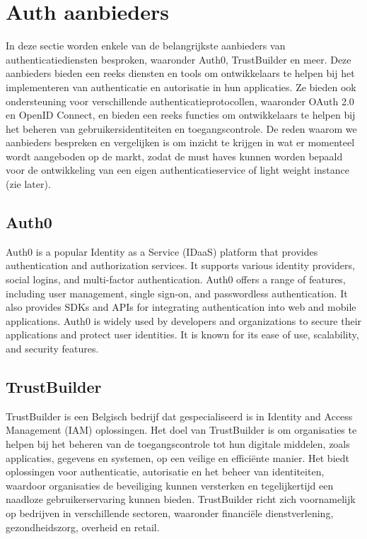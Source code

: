 \section{Auth aanbieders}%
\label{sec:auth-aanbieders}
In deze sectie worden enkele van de belangrijkste aanbieders van authenticatiediensten besproken, waaronder Auth0, TrustBuilder en meer. Deze aanbieders bieden een reeks diensten en tools om ontwikkelaars te helpen bij het implementeren van authenticatie en autorisatie in hun applicaties. Ze bieden ook ondersteuning voor verschillende authenticatieprotocollen, waaronder OAuth 2.0 en OpenID Connect, en bieden een reeks functies om ontwikkelaars te helpen bij het beheren van gebruikersidentiteiten en toegangscontrole.
De reden waarom we aanbieders bespreken en vergelijken is om inzicht te krijgen in wat er momenteel wordt aangeboden op de markt, zodat de must haves kunnen worden bepaald voor de ontwikkeling van een eigen authenticatieservice of light weight instance (zie later).


\subsection{Auth0}%
\label{subsec:auth0}
Auth0 is a popular Identity as a Service (IDaaS) platform that provides authentication and authorization services. It supports various identity providers, social logins, and multi-factor authentication. Auth0 offers a range of features, including user management, single sign-on, and passwordless authentication. It also provides SDKs and APIs for integrating authentication into web and mobile applications. Auth0 is widely used by developers and organizations to secure their applications and protect user identities. It is known for its ease of use, scalability, and security features.


\subsection{TrustBuilder}%
\label{subsec:trustbuilder}
TrustBuilder is een Belgisch bedrijf dat gespecialiseerd is in Identity and Access Management (IAM) oplossingen. Het doel van TrustBuilder is om organisaties te helpen bij het beheren van de toegangscontrole tot hun digitale middelen, zoals applicaties, gegevens en systemen, op een veilige en efficiënte manier. Het biedt oplossingen voor authenticatie, autorisatie en het beheer van identiteiten, waardoor organisaties de beveiliging kunnen versterken en tegelijkertijd een naadloze gebruikerservaring kunnen bieden. TrustBuilder richt zich voornamelijk op bedrijven in verschillende sectoren, waaronder financiële dienstverlening, gezondheidszorg, overheid en retail.



